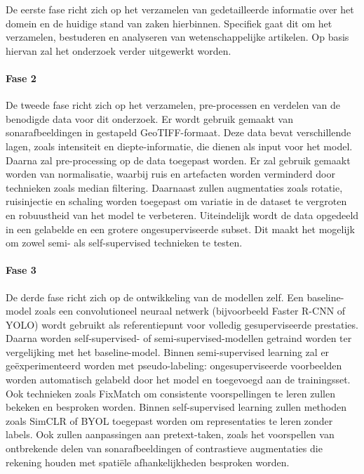 De eerste fase richt zich op het verzamelen van gedetailleerde informatie over het domein en de huidige stand van zaken hierbinnen. Specifiek gaat dit om het verzamelen, bestuderen en analyseren van wetenschappelijke artikelen. Op basis hiervan zal het onderzoek verder uitgewerkt worden.

\paragraph{Fase 2}

De tweede fase richt zich op het verzamelen, pre-processen en verdelen van de benodigde data voor dit onderzoek. Er wordt gebruik gemaakt van sonarafbeeldingen in gestapeld GeoTIFF-formaat. Deze data bevat verschillende lagen, zoals intensiteit en diepte-informatie, die dienen als input voor het model. Daarna zal pre-processing op de data toegepast worden. Er zal gebruik gemaakt worden van normalisatie, waarbij ruis en artefacten worden verminderd door technieken zoals median filtering. Daarnaast zullen augmentaties zoals rotatie, ruisinjectie en schaling worden toegepast om variatie in de dataset te vergroten en robuustheid van het model te verbeteren. Uiteindelijk wordt de data opgedeeld in een gelabelde en een grotere ongesuperviseerde subset. Dit maakt het mogelijk om zowel semi- als self-supervised technieken te testen.

\paragraph{Fase 3}

De derde fase richt zich op de ontwikkeling van de modellen zelf. Een baseline-model zoals een convolutioneel neuraal netwerk (bijvoorbeeld Faster R-CNN of YOLO) wordt gebruikt als referentiepunt voor volledig gesuperviseerde prestaties. Daarna worden self-supervised- of semi-supervised-modellen getraind worden ter vergelijking met het baseline-model. Binnen semi-supervised learning zal er geëxperimenteerd worden met pseudo-labeling: ongesuperviseerde voorbeelden worden automatisch gelabeld door het model en toegevoegd aan de trainingsset. Ook technieken zoals FixMatch om consistente voorspellingen te leren zullen bekeken en besproken worden. Binnen self-supervised learning zullen methoden zoals SimCLR of BYOL toegepast worden om representaties te leren zonder labels. Ook zullen aanpassingen aan pretext-taken, zoals het voorspellen van ontbrekende delen van sonarafbeeldingen of contrastieve augmentaties die rekening houden met spatiële afhankelijkheden besproken worden.

